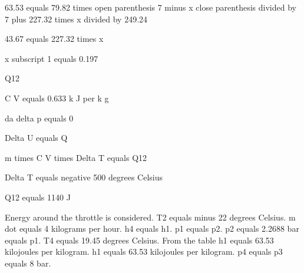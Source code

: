63.53 equals 79.82 times open parenthesis 7 minus x close parenthesis divided by 7 plus 227.32 times x divided by 249.24

43.67 equals 227.32 times x

x subscript 1 equals 0.197

Q12

C V equals 0.633 k J per k g

da delta p equals 0

Delta U equals Q

m times C V times Delta T equals Q12

Delta T equals negative 500 degrees Celsius

Q12 equals 1140 J

Energy around the throttle is considered. T2 equals minus 22 degrees Celsius. m dot equals 4 kilograms per hour. h4 equals h1. p1 equals p2. p2 equals 2.2688 bar equals p1. T4 equals 19.45 degrees Celsius. From the table h1 equals 63.53 kilojoules per kilogram. h1 equals 63.53 kilojoules per kilogram. p4 equals p3 equals 8 bar.